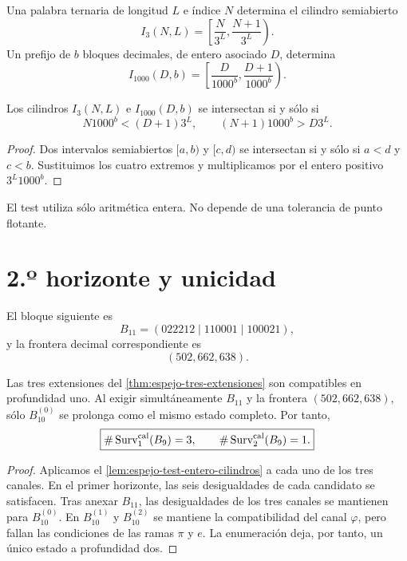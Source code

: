 Una palabra ternaria de longitud \(L\) e índice \(N\) determina el cilindro
semiabierto
\[
 I_3(N,L)=\left[\frac{N}{3^L},\frac{N+1}{3^L}\right).
\]
Un prefijo de \(b\) bloques decimales, de entero asociado \(D\), determina
\[
 I_{1000}(D,b)=
 \left[\frac{D}{1000^b},\frac{D+1}{1000^b}\right).
\]

\begin{lemma}
\label{lem:espejo-test-entero-cilindros}
Los cilindros \(I_3(N,L)\) e \(I_{1000}(D,b)\) se intersectan si y sólo si
\[
 N1000^b<(D+1)3^L,
 \qquad
 (N+1)1000^b>D3^L.
\]
\end{lemma}

\begin{proof}
Dos intervalos semiabiertos \([a,b)\) y \([c,d)\) se intersectan si y sólo
si \(a<d\) y \(c<b\). Sustituimos los cuatro extremos y multiplicamos por
el entero positivo \(3^L1000^b\).
\end{proof}

El test utiliza sólo aritmética entera. No depende de una tolerancia de punto
flotante.

\section{2.º horizonte y unicidad}

El bloque siguiente es
\[
 B_{11}=(022212\mid110001\mid100021),
\]
y la frontera decimal correspondiente es
\[
 (502,662,638).
\]

\begin{theorem}
\label{thm:espejo-seleccion-tres-uno}
Las tres extensiones del \cref{thm:espejo-tres-extensiones} son compatibles
en profundidad uno. Al exigir simultáneamente \(B_{11}\) y la frontera
\((502,662,638)\), sólo \(B_{10}^{(0)}\) se prolonga como el mismo estado
completo. Por tanto,
\[
 \boxed{
 \#\operatorname{Surv}^{\rm cal}_1(B_9)=3,
 \qquad
 \#\operatorname{Surv}^{\rm cal}_2(B_9)=1.}
\]
\end{theorem}

\begin{proof}
Aplicamos el \cref{lem:espejo-test-entero-cilindros} a cada uno de los tres
canales. En el primer horizonte, las seis desigualdades de cada candidato se
satisfacen. Tras anexar \(B_{11}\), las desigualdades de los tres canales
se mantienen para \(B_{10}^{(0)}\). En \(B_{10}^{(1)}\) y
\(B_{10}^{(2)}\) se mantiene la compatibilidad del canal \(\varphi\), pero
fallan las condiciones de las ramas \(\pi\) y \(e\). La enumeración deja,
por tanto, un único estado a profundidad dos.
\end{proof}

